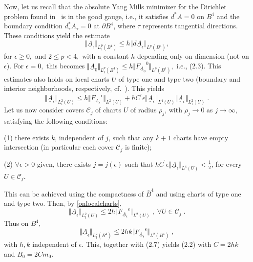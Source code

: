 \documentclass[11pt]{article}
\numberwithin{equation}{section} \setlength{\topmargin}{-35pt}
\begin{document}
 Now, let us recall that the absolute Yang Mills minimizer for the Dirichlet problem found
 in~\cite{Marini} is in the good gauge, i.e., it satisfies $d^*A=0$ on $B^4$ and the boundary condition $d^*_\tau A_\tau=0$ at $\partial B^4$, where $\tau$ represents tangential
 directions. These conditions yield the estimate
 \begin{equation}
 \label{estimate}
 \Vert {\underline   A}_\epsilon\Vert _{L^p_1(B^4)}\leq h \Vert d{\underline  A}_\epsilon\Vert _{L^p(B^4)},
 \end{equation}
 for $\epsilon\geq 0,$ and $2\leq p <4,$ with a constant $h$ depending
 only on dimension (not on $\epsilon$).
 For $\epsilon=0,$ this becomes $\Vert {\underline A}_0\Vert _{L^p_1(B^4)}\leq h \Vert {F_{\underline{A}_0}}^0\Vert_{L^p(B^4)},$ i.e., (2.3).
 This estimates also holds on local charts $U$ of type one and type two (boundary and interior neighborhoods, respectively, cf.~\cite{Marini}).
 This yields
 \begin{equation}
 \label{onlocalcharts}
 \Vert {\underline  A}_\epsilon\Vert_{L^2_1(U)}\leq
 h\Vert{F_{\underline{A}_{\epsilon}}}^{\epsilon}\Vert_{L^2(U)} +
 hC^\prime\epsilon\Vert {\underline  A}_\epsilon\Vert_{L^4(U)}\Vert {\underline  A}_\epsilon\Vert_{L^2_1(U)}\;.
 \end{equation}
 Let us now consider covers ${\mathcal C}_j$ of charts $U$ of
 radius $\rho_j$, with $\rho_j\to 0$ as $j\to\infty$, satisfying the following conditions:

 \noindent
 (1) there exists $k$, independent of $j$,
 such that any $k+1$ charts have empty intersection (in particular each cover ${\mathcal C}_j$ is
 finite);

 \noindent
 (2) $\forall \epsilon>0$ given, there exists $j=j(\epsilon)$ such that $hC^\prime\epsilon\Vert
{\underline  A}_\epsilon\Vert_{L^4(U)}<
 \frac{1}{2}$, for every $U\in{\mathcal C}_j$.

 \noindent This can be achieved using the compactness of ${\overline
 B}^4$ and using charts of type one and type two.
Then, by \eqref{onlocalcharts},
\begin{equation}
\Vert {\underline A}_\epsilon\Vert_{L^2_1(U)}\leq 2 h\Vert
{F_{\underline{A}_{\epsilon}}}^{\epsilon}\Vert_{L^2(U)}\;,\;\forall
U\in{\mathcal C}_j\;.
\end{equation}
Thus on $B^4$,
$$\Vert {\underline  A}_\epsilon\Vert _{L^2_1(B^4)}\leq
2 h
k\Vert{F_{\underline{A}_{\epsilon}}}^{\epsilon}\Vert_{L^2(B^4)}\;,$$
with $h,k$ independent of $\epsilon$. This, together with (2.7)
yields (2.2) with $C=2hk$ and $B_0= 2Cm_0.$
\end{document}
